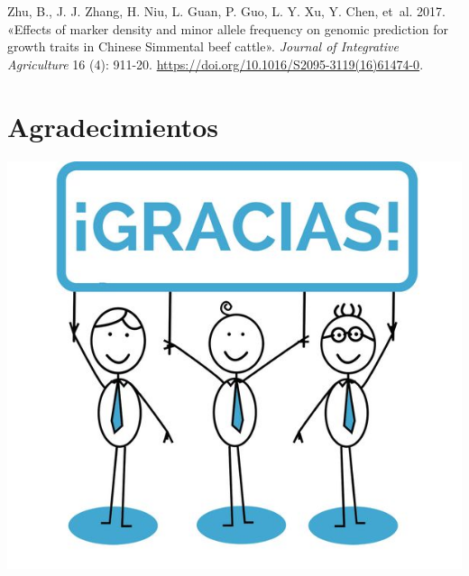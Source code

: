 \documentclass[11pt,spanish,a4paper,oneside,]{book} %
\begin{document}
\leavevmode\hypertarget{ref-cite:83}{}%
Zhu, B., J. J. Zhang, H. Niu, L. Guan, P. Guo, L. Y. Xu, Y. Chen, et~al. 2017. «Effects of marker density and minor allele frequency on genomic prediction for growth traits in Chinese Simmental beef cattle». \emph{Journal of Integrative Agriculture} 16 (4): 911-20. \url{https://doi.org/10.1016/S2095-3119(16)61474-0}.

\endgroup

\hypertarget{agradecimientos}{%
\chapter*{Agradecimientos}\label{agradecimientos}}


\includegraphics{figures/uvalogo_regular_p_en.pdf}

\backmatter
\end{document}
